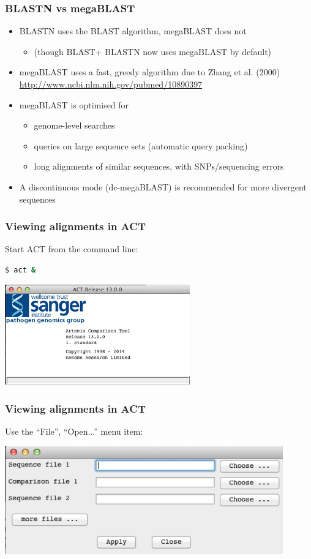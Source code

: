 \documentclass[table]{beamer}
\begin{document}
  \begin{frame}
    \frametitle{BLASTN vs megaBLAST}
    \begin{itemize}
      \item<1-> BLASTN uses the BLAST algorithm, megaBLAST does not
      \begin{itemize}
        \item (though BLAST+ BLASTN now uses megaBLAST by default)
      \end{itemize}      
      \item<1-> megaBLAST uses a fast, greedy algorithm due to Zhang et al. (2000) \url{http://www.ncbi.nlm.nih.gov/pubmed/10890397}
      \item<2-> megaBLAST is optimised for
      \begin{itemize}
        \item genome-level searches
        \item queries on large sequence sets (automatic query packing)
        \item long alignments of similar sequences, with SNPs/sequencing errors
      \end{itemize}
      \item<2-> A discontinuous mode (dc-megaBLAST) is recommended for more divergent sequences
    \end{itemize}
\end{frame}

\begin{frame}[fragile]
\frametitle{Viewing alignments in ACT}
Start ACT from the command line:
\begin{lstlisting}[language=bash]
$ act &
\end{lstlisting}
      \begin{center}
        \includegraphics[width=0.6\textwidth]{images/act_wgs1}
      \end{center}
\end{frame}

    \begin{frame}
      \frametitle{Viewing alignments in ACT}
       Use the ``File'', ``Open...'' menu item:
      \begin{center}
        \includegraphics[width=0.9\textwidth]{images/act_wgs2}
      \end{center}
    \end{frame}
\end{document}
